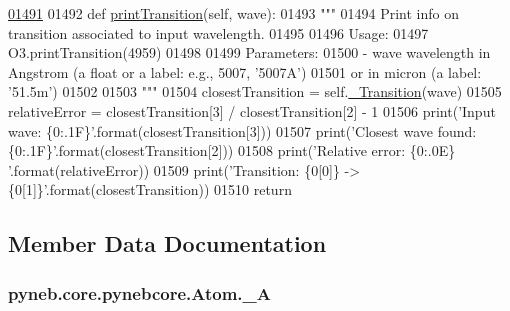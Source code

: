 \begin{DoxyCode}
\hypertarget{classpyneb_1_1core_1_1pynebcore_1_1_atom_l01491}{}\hyperlink{classpyneb_1_1core_1_1pynebcore_1_1_atom_a32f644fb6c648326e3422984b614b63c}{01491} 
01492     \textcolor{keyword}{def }\hyperlink{classpyneb_1_1core_1_1pynebcore_1_1_atom_a32f644fb6c648326e3422984b614b63c}{printTransition}(self, wave):
01493         \textcolor{stringliteral}{"""}
01494 \textcolor{stringliteral}{        Print info on transition associated to input wavelength.}
01495 \textcolor{stringliteral}{        }
01496 \textcolor{stringliteral}{        Usage:}
01497 \textcolor{stringliteral}{            O3.printTransition(4959)}
01498 \textcolor{stringliteral}{            }
01499 \textcolor{stringliteral}{        Parameters:}
01500 \textcolor{stringliteral}{            - wave      wavelength in Angstrom (a float or a label: e.g., 5007, '5007A') }
01501 \textcolor{stringliteral}{                or in micron (a label: '51.5m')}
01502 \textcolor{stringliteral}{                }
01503 \textcolor{stringliteral}{        """}
01504         closestTransition = self.\hyperlink{classpyneb_1_1core_1_1pynebcore_1_1_atom_a69f29cc10c77910841f9e3ff8ddef250}{\_Transition}(wave)
01505         relativeError = closestTransition[3] / closestTransition[2] - 1
01506         print(\textcolor{stringliteral}{'Input wave: \{0:.1F\}'}.format(closestTransition[3]))
01507         print(\textcolor{stringliteral}{'Closest wave found: \{0:.1F\}'}.format(closestTransition[2]))
01508         print(\textcolor{stringliteral}{'Relative error: \{0:.0E\} '}.format(relativeError))
01509         print(\textcolor{stringliteral}{'Transition: \{0[0]\} -> \{0[1]\}'}.format(closestTransition))
01510         \textcolor{keywordflow}{return}
    
\end{DoxyCode}


\subsection{Member Data Documentation}
\hypertarget{classpyneb_1_1core_1_1pynebcore_1_1_atom_aa6416fe661b8deaa008179314727e025}{
\subsubsection[{\-\_\-\-A}]{\setlength{\rightskip}{0pt plus 5cm}pyneb.\-core.\-pynebcore.\-Atom.\-\_\-\-A\hspace{0.3cm}{\ttfamily [private]}}}\label{classpyneb_1_1core_1_1pynebcore_1_1_atom_aa6416fe661b8deaa008179314727e025}


